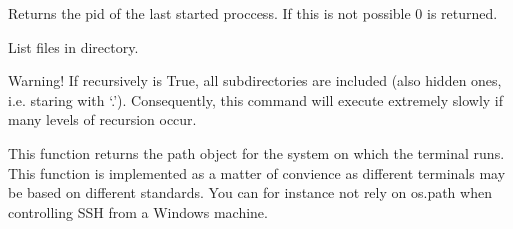 \documentclass[letterpaper,10pt,english]{sphinxmanual}
\begin{document}
\begin{fulllineitems}
\begin{fulllineitems}
\end{fulllineitems}


\begin{fulllineitems}
\label{api/shell_terminals:batchq.pipelines.shell.bash.BashTerminal.last_pid}
Returns the pid of the last started proccess. If this is
not possible 0 is returned.

\end{fulllineitems}


\begin{fulllineitems}
\label{api/shell_terminals:batchq.pipelines.shell.bash.BashTerminal.list}
List files in directory.

Warning! If recursively is True, all subdirectories are included
(also hidden ones, i.e. staring with `.'). Consequently, this
command will execute extremely slowly if many levels of
recursion occur.

\end{fulllineitems}


\begin{fulllineitems}
\label{api/shell_terminals:batchq.pipelines.shell.bash.BashTerminal.mkdir}
\end{fulllineitems}


\begin{fulllineitems}
\label{api/shell_terminals:batchq.pipelines.shell.bash.BashTerminal.path}
This function returns the path object for the system on which
the terminal runs. This function is
implemented as a matter of convience as different terminals may
be based on different standards. You can for instance not rely on
os.path when controlling SSH from a Windows machine.

\end{fulllineitems}



\end{fulllineitems}
\end{document}
